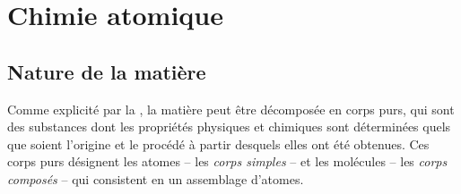 \chapter{Chimie atomique}
\label{chap:chimie_atomique}
\ChapFrame %

\section{Nature de la matière}

Comme explicité par la  %
, la matière peut être décomposée en corps purs, qui sont des substances dont les propriétés physiques et chimiques sont déterminées quels que soient l'origine et le procédé à partir desquels elles ont été obtenues. Ces corps purs désignent les atomes -- les \emph{corps simples} -- et les molécules -- les \emph{corps composés} -- qui consistent en un assemblage d'atomes.
 
